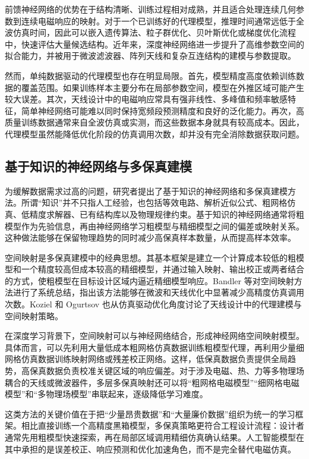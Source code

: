 \documentclass[UTF8,a4paper,12pt]{ctexart}
\begin{document}
前馈神经网络的优势在于结构清晰、训练过程相对成熟，并且适合处理连续几何参数到连续电磁响应的映射。对于一个已训练好的代理模型，推理时间通常远低于全波仿真时间，因此可以嵌入遗传算法、粒子群优化、贝叶斯优化或梯度优化流程中，快速评估大量候选结构。近年来，深度神经网络进一步提升了高维参数空间的拟合能力，并被用于微波滤波器、阵列天线和复杂互连结构的建模与参数提取\cite{jin2019deep,feng2022ann}。

然而，单纯数据驱动的代理模型也存在明显局限。首先，模型精度高度依赖训练数据的覆盖范围。如果训练样本主要分布在局部参数空间，模型在外推区域可能产生较大误差。其次，天线设计中的电磁响应常具有强非线性、多峰值和频率敏感特征，简单神经网络可能难以同时保持宽频段预测精度和良好的泛化能力。再次，高质量训练数据通常来自全波仿真或实测，而这些数据本身就具有较高成本。因此，代理模型虽然能降低优化阶段的仿真调用次数，却并没有完全消除数据获取问题。

\subsection{基于知识的神经网络与多保真建模}

为缓解数据需求过高的问题，研究者提出了基于知识的神经网络和多保真建模方法。所谓“知识”并不只指人工经验，也包括等效电路、解析近似公式、粗网格仿真、低精度求解器、已有结构库以及物理规律约束。基于知识的神经网络通常将粗模型作为先验信息，再由神经网络学习粗模型与精细模型之间的偏差或映射关系。这种做法能够在保留物理趋势的同时减少高保真样本数量，从而提高样本效率\cite{wang1997kbnn,watson1999kbann,na2017unified,simsek2010recent,ojaroudi2018uwb}。

空间映射是多保真建模中的经典思想。其基本框架是建立一个计算成本较低的粗模型和一个精度较高但成本较高的精细模型，并通过输入映射、输出校正或两者结合的方式，使粗模型在目标设计区域内逼近精细模型响应。Bandler 等对空间映射方法进行了系统总结，指出该方法能够在微波和天线优化中显著减少高精度仿真调用次数\cite{bandler2004space}。Koziel 和 Ogurtsov 也从仿真驱动优化角度讨论了天线设计中的代理建模与空间映射策略\cite{koziel2014antenna}。

在深度学习背景下，空间映射可以与神经网络结合，形成神经网络空间映射模型。具体而言，可以先利用大量低成本粗网格仿真数据训练粗模型代理，再利用少量细网格仿真数据训练映射网络或残差校正网络。这样，低保真数据负责提供全局趋势，高保真数据负责校准关键区域的响应偏差。对于涉及电磁、热、力等多物理场耦合的天线或微波器件，多层多保真映射还可以将“粗网格电磁模型”“细网格电磁模型”和“多物理场模型”串联起来，逐级降低学习难度\cite{zhang2021parallel,zhang2021advanced,yang2025multifidelity}。

这类方法的关键价值在于把“少量昂贵数据”和“大量廉价数据”组织为统一的学习框架。相比直接训练一个高精度黑箱模型，多保真策略更符合工程设计流程：设计者通常先用粗模型快速探索，再在局部区域调用精细仿真确认结果。人工智能模型在其中承担的是误差校正、响应预测和优化加速角色，而不是完全替代电磁仿真。
\end{document}
